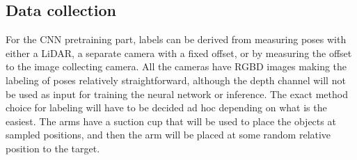 \subsection{Data collection}

For the CNN pretraining part, labels can be derived from measuring poses with
either a LiDAR, a separate camera with a fixed offset, or by measuring the
offset to the image collecting camera. All the cameras have RGBD images making
the labeling of poses relatively straightforward, although the depth channel
will not be used as input for training the neural network or inference. The
exact method choice for labeling will have to be decided ad hoc depending on
what is the easiest. The arms have a suction cup that will be used to place the
objects at sampled positions, and then the arm will be placed at some random
relative position to the target.

